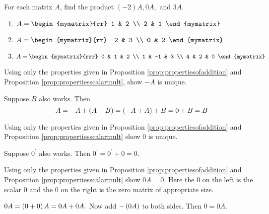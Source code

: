 \begin{enumialphparenastyle}

\begin{ex} For each matrix $A$, find the product $(-2)A, 0A,$ and $3A$. 
\begin{enumerate}
\item
$A = \begin{mymatrix}{rr}
1 & 2 \\
2 & 1 
\end{mymatrix}$

\item
$A = \begin{mymatrix}{rr}
-2 & 3 \\
0 & 2 
\end{mymatrix}$

\item
$A = \begin{mymatrix}{rrr}
0 & 1 & 2 \\
1 & -1 & 3 \\
4 & 2 & 0 
\end{mymatrix}$
\end{enumerate}
\end{ex}

\begin{ex} \label{addinvrstunique} Using only the properties given in Proposition \ref{prop:propertiesofaddition}
 and Proposition \ref{prop:propertiesscalarmult}, 
show $-A$ is unique.
\begin{sol}
 Suppose $B$ also works. Then
\[
-A=-A+\left(A+B\right) =\left(-A+A\right) +B=0+B=B
\]
\end{sol}
\end{ex}

\begin{ex} Using only the properties given in Proposition \ref{prop:propertiesofaddition} 
and Proposition \ref{prop:propertiesscalarmult}
show $0$ is unique. 
\begin{sol}
Suppose $0^{\prime }$ also works. Then $0^{\prime }=0^{\prime }+0=0.$
\end{sol}
\end{ex}

\begin{ex} Using only the properties given in Proposition \ref{prop:propertiesofaddition}
 and Proposition \ref{prop:propertiesscalarmult} show $0A=0.$ Here
the $0$ on the left is the scalar $0$ and the $0$ on the right is the zero matrix of appropriate size.
\begin{sol}
$0A=\left(0+0\right) A=0A+0A.$ Now add $-\left(
0A\right) $ to both sides. Then $0=0A$.
\end{sol}
\end{ex}


\end{enumialphparenastyle}
